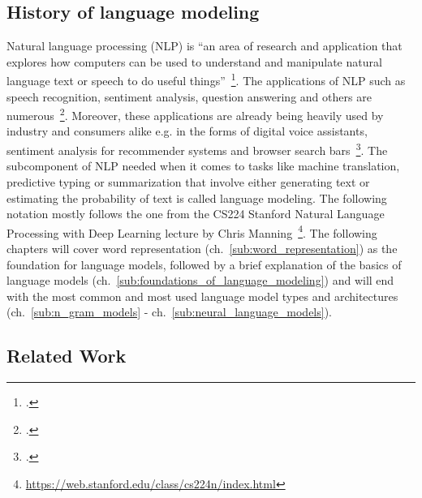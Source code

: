 \subsection{History of language modeling}
\label{sec:history_of_language_modeling}

Natural language processing (NLP) is “an area of research and application that explores how computers can be used to understand and manipulate natural language text or speech to do useful things”~\footcite{doi:10.1002/aris.1440370103}. The applications of NLP such as speech recognition, sentiment analysis, question answering and others are numerous~\footcite{DBLP:journals/corr/GattK17}. Moreover, these applications are already being heavily used by industry and consumers alike e.g. in the forms of digital voice assistants, sentiment analysis for recommender systems and browser search bars~\footcite{8012330,10.1145/3064663.3064672,GoogleSearch}. The subcomponent of NLP needed when it comes to tasks like machine translation, predictive typing or summarization that involve either generating text or estimating the probability of text is called language modeling. The following notation mostly follows the one from the CS224 Stanford Natural Language Processing with Deep Learning lecture by Chris Manning~\footnote{\url{https://web.stanford.edu/class/cs224n/index.html}}. The following chapters will cover word representation (ch.~\ref{sub:word_representation}) as the foundation for language models, followed by a brief explanation of the basics of language models (ch.~\ref{sub:foundations_of_language_modeling}) and will end with the most common and most used language model types and architectures (ch.~\ref{sub:n_gram_models} - ch.~\ref{sub:neural_language_models}).















\subsection{Related Work}
\label{sec:related_work}

